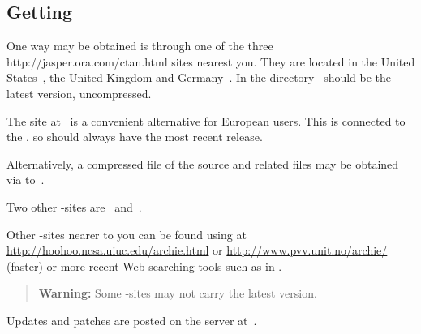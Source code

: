 \startdocument
%
\subsection[center]{Getting \protect\latextohtml}
\tableofchildlinks*
\htmlrule
{}%
%
%
\begin{changebar}%
One way \latextohtml may be obtained is through one of the three
%
{http://jasper.ora.com/ctan.html} sites nearest you.  They are
located in the United States
\,,
the United Kingdom
and Germany
\,.
In the directory \CTAN\ should be the latest version, uncompressed.

\smallskip\noindent
{}\begin{changebar}
The site at \CVSsite\ is a convenient alternative for European users.
This is connected to the ,
so should always have the most recent release.
\end{changebar}

%
\smallskip\noindent
Alternatively, a compressed  file of the source and related files
may be obtained via  to \sourceA\,.

\smallskip\noindent
Two other -sites are \sourceB\ and \sourceC\,.

%
%
\smallskip\noindent
Other -sites nearer to you can be found using  at
\url{http://hoohoo.ncsa.uiuc.edu/archie.html} or
\url{http://www.pvv.unit.no/archie/} (faster)
or more recent Web-searching tools such as 
in .
\begin{quote}
\textbf{Warning: }%
Some -sites may not carry the latest version.
\end{quote}

%
\smallskip\noindent
Updates and patches are posted on the \latextohtml{} server at \patches\,.
\end{changebar}

